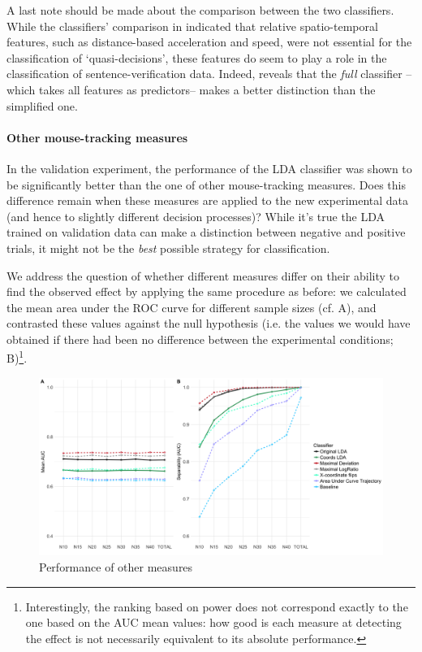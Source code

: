 \documentclass{article}
\begin{document}
A last note should be made about the comparison between the two classifiers. While the classifiers' comparison in  indicated that relative spatio-temporal features, such as distance-based acceleration and speed, were not essential for the classification of `quasi-decisions', these features do seem to play a role in the classification of sentence-verification data. Indeed,  reveals that the \emph{full} classifier --which takes all features as predictors-- makes a better distinction than the simplified one.   

\paragraph{Other mouse-tracking measures}
In the validation experiment, the performance of the LDA classifier was shown to be significantly better than the one of other mouse-tracking measures. Does this difference remain when these measures are applied to the new experimental data (and hence to slightly different decision processes)? 
While it's true the LDA trained on validation data can make a distinction between negative and positive trials, it might not be the \emph{best} possible strategy for classification. 

We address the question of whether different measures differ on their ability to find the observed effect by applying the same procedure as before: we calculated the mean area under the ROC curve for different sample sizes (cf. A), and contrasted these values against the null hypothesis (i.e. the values we would have obtained if there had been no difference between the experimental conditions; B)\footnote{Interestingly, the ranking based on power does not correspond exactly to the one based on the AUC mean values: how good is each measure at detecting the effect is not necessarily equivalent to its absolute performance.}. 

\begin{figure}
\centering
\includegraphics[width=\textwidth]{auc_permutation_negation_2.png}
\caption{Performance of other measures}
\label{fig:permutation_AUC_negation_measures}
\end{figure}
\end{document}
